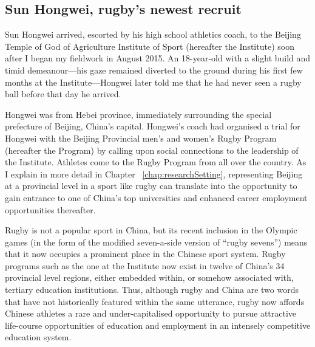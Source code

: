                                   \begin{CJK}{UTF8}{gbsn}

\section{Sun Hongwei, rugby's newest recruit\label{sect:SHW}}
Sun Hongwei arrived, escorted by his high school athletics coach, to the Beijing Temple of God of Agriculture Institute of Sport (hereafter the Institute) soon after I began my fieldwork in August 2015.  An 18-year-old with a slight build and timid demeanour---his gaze remained diverted to the ground during his first few months at the Institute---Hongwei later told me that he had never seen a rugby ball before that day he arrived.

Hongwei was from Hebei province, immediately surrounding the special prefecture of Beijing, China's capital.  Hongwei's coach had organised a trial for Hongwei with the Beijing Provincial men’s and women's Rugby Program (hereafter the Program) by calling upon social connections to the leadership of the Institute.  Athletes come to the Rugby Program from all over the country.  As I explain in more detail in Chapter ~\ref{chap:researchSetting}, representing Beijing at a provincial level in a sport like rugby can translate into the opportunity to gain entrance to one of China's top universities and enhanced career employment opportunities thereafter.

Rugby is not a popular sport in China, but its recent inclusion in the Olympic games (in the form of the modified seven-a-side version of ``rugby sevens'') means that it now occupies a prominent place in the Chinese sport system.  Rugby programs such as the one at the Institute now exist in twelve of China's 34 provincial level regions, either embedded within, or somehow associated with, tertiary education institutions.  Thus, although rugby and China are two words that have not historically featured within the same utterance, rugby now affords Chinese athletes a rare and under-capitalised opportunity to pursue attractive life-course opportunities of education and employment in an intensely competitive education system.


\end{CJK}
